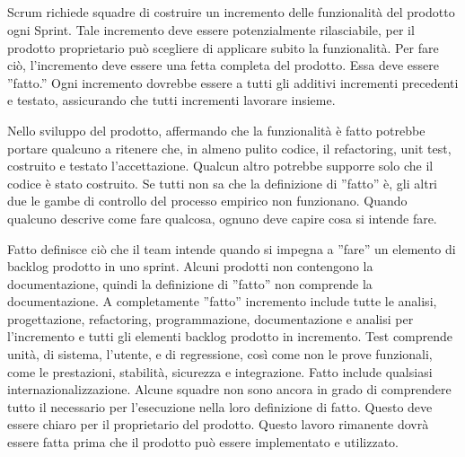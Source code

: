 \subsection*{\color{Blue}{FATTO}}
\label{sec:done}
Scrum richiede squadre di costruire un incremento delle funzionalit\`a del prodotto ogni Sprint. Tale incremento deve
essere potenzialmente rilasciabile, per il prodotto proprietario pu\`o scegliere di applicare subito la funzionalit\`a.
Per fare ci\`o, l'incremento deve essere una fetta completa del prodotto. Essa deve essere ''fatto.'' Ogni incremento
dovrebbe essere a tutti gli additivi incrementi precedenti e testato, assicurando che tutti incrementi lavorare
insieme.

\vspace{0.4cm}
\vspace{0.4cm}
\linebreak

Nello sviluppo del prodotto, affermando che la funzionalit\`a \`e fatto potrebbe portare qualcuno a ritenere che, in
almeno pulito codice, il refactoring, unit test, costruito e testato l'accettazione. Qualcun altro potrebbe supporre
solo che il codice \`e stato costruito. Se tutti non sa che la definizione di ''fatto'' \`e, gli altri due le gambe di
controllo del processo empirico non funzionano. Quando qualcuno descrive come fare qualcosa, ognuno deve capire cosa si
intende fare.\\
\linebreak

Fatto definisce ci\`o che il team intende quando si impegna a ''fare'' un elemento di backlog prodotto in uno sprint.
Alcuni prodotti non contengono la documentazione, quindi la definizione di ''fatto'' non comprende la documentazione. A
completamente ''fatto'' incremento include tutte le analisi, progettazione, refactoring, programmazione, documentazione
e analisi per l'incremento e tutti gli elementi backlog prodotto in incremento. Test comprende unit\`a, di sistema,
l'utente, e di regressione, così come non le prove funzionali, come le prestazioni, stabilit\`a, sicurezza e
integrazione. Fatto include qualsiasi internazionalizzazione. Alcune squadre non sono ancora in grado di comprendere
tutto il necessario per l'esecuzione nella loro definizione di fatto. Questo deve essere chiaro per il proprietario del
prodotto. Questo lavoro rimanente dovr\`a essere fatta prima che il prodotto pu\`o essere implementato e utilizzato.